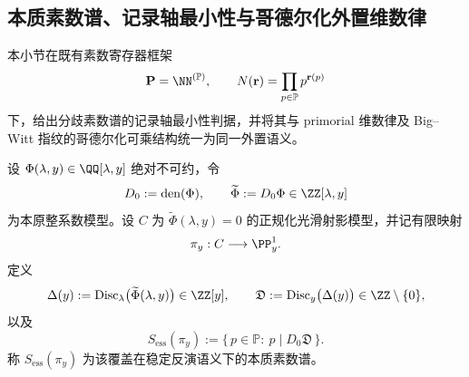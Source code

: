 \subsection{本质素数谱、记录轴最小性与哥德尔化外置维数律}\label{subsec:conclusion-essential-prime-spectrum-primorial-witt}
本小节在既有素数寄存器框架
\[
\mathbf P=\NN^{(\mathbb P)},
\qquad
N(\mathbf r)=\prod_{p\in\mathbb P}p^{\mathbf r(p)}
\]
下，给出分歧素数谱的记录轴最小性判据，并将其与 primorial 维数律及 Big--Witt 指纹的哥德尔化可乘结构统一为同一外置语义。

\begin{definition}[分歧素数谱与本质素数谱]\label{def:conclusion-essential-prime-spectrum}
设 \(\Phi(\lambda,y)\in\QQ[\lambda,y]\) 绝对不可约，令
\[
D_0:=\mathrm{den}(\Phi),\qquad
\widetilde\Phi:=D_0\Phi\in\ZZ[\lambda,y]
\]
为本原整系数模型。设 \(C\) 为 \(\widetilde\Phi(\lambda,y)=0\) 的正规化光滑射影模型，并记有限映射
\[
\pi_y:C\longrightarrow \PP^1_y.
\]
定义
\[
\Delta(y):=\mathrm{Disc}_{\lambda}\bigl(\widetilde\Phi(\lambda,y)\bigr)\in\ZZ[y],
\qquad
\mathfrak D:=\mathrm{Disc}_{y}\bigl(\Delta(y)\bigr)\in\ZZ\setminus\{0\},
\]
以及
\[
S_{\mathrm{ess}}(\pi_y):=\{\,p\in\mathbb P:\ p\mid D_0\mathfrak D\,\}.
\]
称 \(S_{\mathrm{ess}}(\pi_y)\) 为该覆盖在稳定反演语义下的本质素数谱。
\end{definition}

